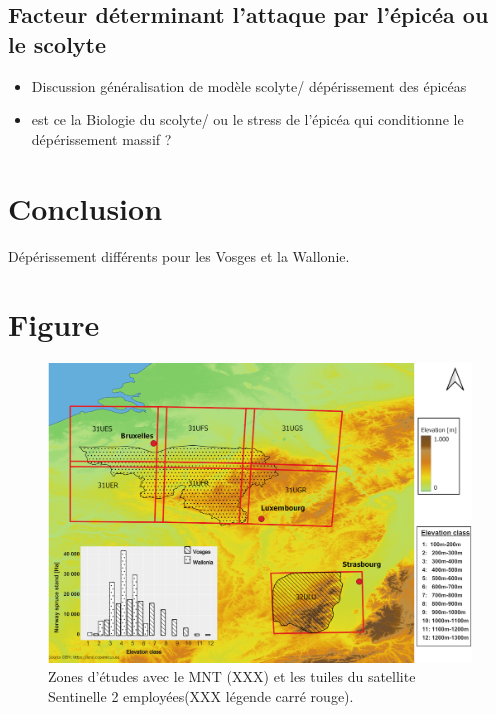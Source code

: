 \documentclass[3p,times]{elsarticle}
\begin{document}
\subsection{Facteur déterminant l'attaque par l'épicéa ou le scolyte}

\begin{itemize}
	\item Discussion généralisation de modèle scolyte/ dépérissement des épicéas
	\item est ce la Biologie du scolyte/ ou le stress de l'épicéa qui conditionne le dépérissement massif ?
	
\end{itemize}

\section{Conclusion}

Dépérissement différents pour les Vosges et la Wallonie.

\section{Figure}

\begin{figure} [htbp] 
	\centering
	\includegraphics[width=1\textwidth]{waql.png}
	\caption{Zones d'études avec le MNT (XXX) et les tuiles du satellite Sentinelle 2 employées(XXX légende carré rouge).}
	\label{fig:situ}
\end{figure}
\end{document}

